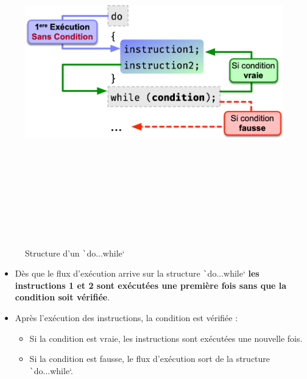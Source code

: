 \documentclass[10pt]{article}
\begin{document}
\smallskip
\begin{multicols}{2}
\begin{figure}[H]
    \includegraphics[max height=15cm,max width = \textwidth/2]{assets/do...while.jpg}
    \centering
    \caption{Structure d'un \texttt`do...while`}
\end{figure}

\begin{itemize}
    \item Dès que le flux d'exécution arrive sur la structure \texttt`do...while` \textbf{les instructions 1 et 2 sont exécutées une première fois sans que la condition soit vérifiée}.
    \item Après l'exécution des instructions, la condition est vérifiée :
    \begin{itemize}
        \item Si la condition est vraie, les instructions sont exécutées une nouvelle fois.
        \item Si la condition est fausse, le flux d'exécution sort de la structure \texttt`do...while`.
    \end{itemize}
\end{itemize}
\end{multicols}
\end{document}
